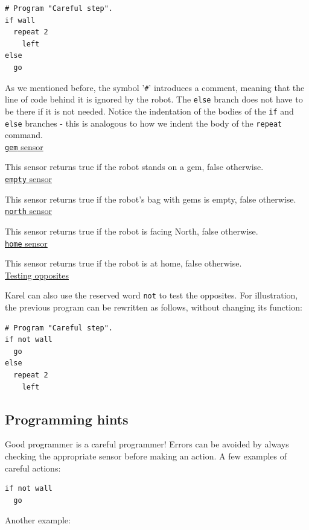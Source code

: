 \documentclass[article,A4,12pt]{llncs}
\begin{document}
{{{{\begin{verbatim}
# Program "Careful step".
if wall
  repeat 2
    left
else
  go
\end{verbatim}
As we mentioned before, the symbol '{\tt \#}' introduces a comment, meaning that the line 
of code behind it is ignored by the robot.
The {\tt else} branch does not have to be there if it is not needed. Notice the indentation 
of the bodies of the {\tt if} and {\tt else} branches - this is analogous 
to how we indent the body of the {\tt repeat} command.\\

\noindent
\underline{{\tt gem} sensor}

This sensor returns true if the robot stands on a gem, false otherwise. \\

\noindent
\underline{{\tt empty} sensor}

This sensor returns true if the robot's bag with gems is empty, false otherwise. \\

\noindent
\underline{{\tt north} sensor}

This sensor returns true if the robot is facing North, false otherwise.\\

\noindent
\underline{{\tt home} sensor}

This sensor returns true if the robot is at home, false otherwise.\\

\noindent
\underline{Testing opposites}

Karel can also use the reserved word {\tt not} to test the opposites.
For illustration, the previous program can be rewritten as follows, without 
changing its function:
\begin{verbatim}
# Program "Careful step".
if not wall
  go
else
  repeat 2
    left
\end{verbatim}

\subsection{Programming hints}

Good programmer is a careful programmer! Errors can be avoided by always checking the 
appropriate sensor before making an action. A few examples of careful actions:
 
\begin{verbatim}
if not wall
  go
\end{verbatim}
Another example:
 
}}}}
\end{document}
